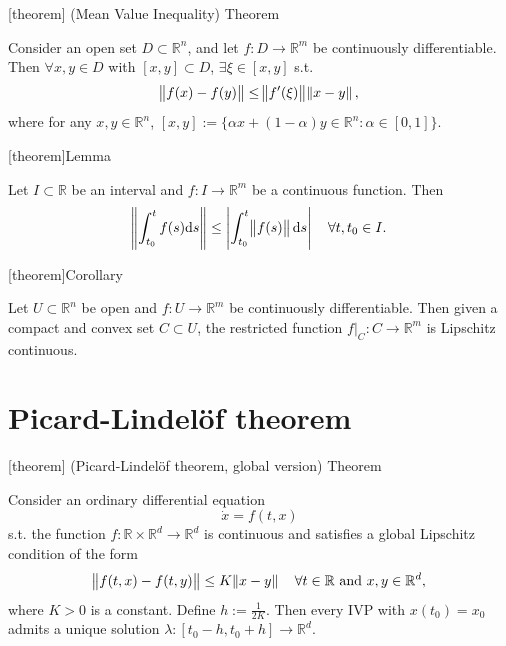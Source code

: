 \documentclass[12pt]{report}
\theoremstyle{definition}
\begin{document}
[theorem]
{(Mean Value Inequality) Theorem}
\begin{mean value inequality}
    Consider an open set $D\subset \mathbb{R}^{n}$, and let 
    $f:D\rightarrow\mathbb{R}^{m}$ be continuously differentiable.
    Then $\forall x,y\in D$ with $[x,y]\subset D$, $\exists \xi\in[x,y]$ s.t.
    \[
        \norm{f(x)-f(y)}\le\norm{f'(\xi)}\norm{x-y},
    \]
    where for any $x,y\in\mathbb{R}^{n}$,
    $[x,y]:=\{\alpha x+(1-\alpha)y\in\mathbb{R}^{n}:\alpha\in[0,1]\}$.
\end{mean value inequality}

[theorem]{Lemma}
\begin{triangle-like inequality for integrals}
    Let $I\subset \mathbb{R}$ be an interval and $f:I\rightarrow\mathbb{R}^{m}$
    be a continuous function. Then
    \[
        \norm{\int_{t_0}^{t}f(s)\mathrm{d}s}\le\left|\int_{t_0}^{t}
        \norm{f(s)}\mathrm{d}s\right|
        \quad\forall t, t_0\in I.
    \]
\end{triangle-like inequality for integrals}

[theorem]{Corollary}
\begin{Lipschitz continuity and the mean value inequality}
    Let $U\subset\mathbb{R}^{n}$ be open and $f:U\rightarrow\mathbb{R}^{m}$ be
    continuously differentiable. Then given a compact and convex set $C\subset U$,
    the restricted function $f|_C:C\rightarrow\mathbb{R}^{m}$ is Lipschitz continuous.
\end{Lipschitz continuity and the mean value inequality}

\section{Picard-Lindel\"{o}f theorem}

[theorem]
{(Picard-Lindel\"{o}f theorem, global version) Theorem}
\begin{Picard-Lindelof theorem, global version}
    Consider an ordinary differential equation
    \[
        \dot{x}=f(t,x)
    \]
    s.t. the function $f:\mathbb{R}\times\mathbb{R}^{d}\rightarrow\mathbb{R}^{d}$
    is continuous and satisfies a global Lipschitz condition of the form
    \[
        \norm{f(t,x)-f(t,y)}\le K\norm{x-y} \quad\forall t\in\mathbb{R}
        \text{ and } x,y\in\mathbb{R}^{d},
    \]
    where $K>0$ is a constant. Define $h:=\frac{1}{2K}$.
    Then every IVP with $x(t_0)=x_0$ admits a unique solution 
    $\lambda:[t_0-h,t_0+h]\rightarrow\mathbb{R}^{d}$.
\end{Picard-Lindelof theorem, global version}
\end{document}
